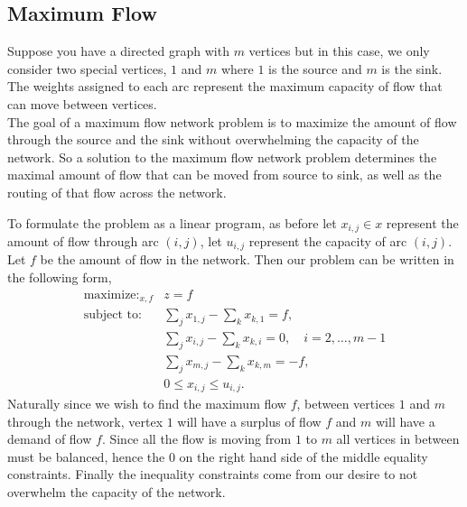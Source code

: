 \documentclass[12pt]{amsart}
\begin{document}
\subsection{Maximum Flow}
Suppose you have a directed graph with $m$ vertices but in this case, we only consider two special vertices, $1$ and $m$ where $1$ is 
the source and $m$ is the sink. The weights assigned to each arc represent the maximum capacity of flow that can move between vertices. \\


The goal of a maximum flow network problem is to maximize the amount of flow through the source and the sink without overwhelming the capacity of the network. So a solution to the maximum flow network problem determines the maximal amount of flow that can be moved from source to sink, as well as the routing of that flow across the network. 

To formulate the problem as a linear program, as before let $x_{i, j} \in x$ represent the amount of flow through arc $(i, j)$, let $u_{i, j}$ represent the capacity of arc $(i, j)$. Let $f$ be the amount of flow in the network. Then our problem can be written in the following form, 
\begin{align*}
    \mathop{\text{maximize: }}_{x, f} &z = f\\
    \text{subject to: } &\sum_{j}x_{1, j} - \sum_{k}x_{k, 1} = f,\\
    &\sum_{j}x_{i, j} - \sum_{k}x_{k, i} = 0, \quad i = 2, \dots, m - 1\\
    &\sum_{j}x_{m, j} - \sum_{k}x_{k, m} = -f,\\
    &0 \leq x_{i, j} \leq u_{i, j}.
\end{align*}
Naturally since we wish to find the maximum flow $f$, between vertices $1$ and $m$ through the network, vertex $1$ will have a surplus of flow $f$ and 
$m$ will have a demand of flow $f$. Since all the flow is moving from $1$ to $m$ all vertices in between must be balanced, hence the 0 on the right hand side of the middle equality constraints. Finally the inequality constraints come from our desire to not overwhelm the capacity of the network. 
\end{document}
